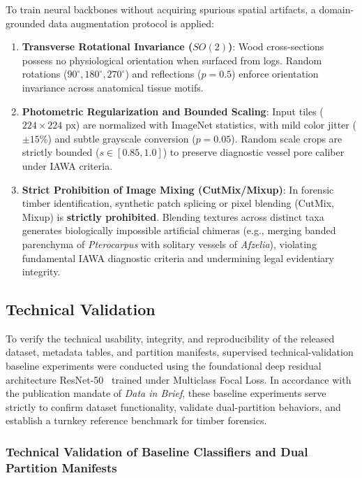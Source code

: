 \documentclass[a4paper,fleqn,12pt]{cas-sc}
\begin{document}
To train neural backbones without acquiring spurious spatial artifacts, a domain-grounded data augmentation protocol is applied:
\begin{enumerate}[leftmargin=*,itemsep=1pt,topsep=1pt]
    \item \textbf{Transverse Rotational Invariance ($SO(2)$)}: Wood cross-sections possess no physiological orientation when surfaced from logs. Random rotations ($90^\circ, 180^\circ, 270^\circ$) and reflections ($p = 0.5$) enforce orientation invariance across anatomical tissue motifs.
    \item \textbf{Photometric Regularization and Bounded Scaling}: Input tiles ($224 \times 224$ px) are normalized with ImageNet statistics, with mild color jitter ($\pm 15\%$) and subtle grayscale conversion ($p = 0.05$). Random scale crops are strictly bounded ($s \in [0.85, 1.0]$) to preserve diagnostic vessel pore caliber under IAWA criteria.
    \item \textbf{Strict Prohibition of Image Mixing (CutMix/Mixup)}: In forensic timber identification, synthetic patch splicing or pixel blending (CutMix, Mixup) is \textbf{strictly prohibited}. Blending textures across distinct taxa generates biologically impossible artificial chimeras (e.g., merging banded parenchyma of \textit{Pterocarpus} with solitary vessels of \textit{Afzelia}), violating fundamental IAWA diagnostic criteria and undermining legal evidentiary integrity.
\end{enumerate}

\subsection{Technical Validation}
\label{sec:technical_validation}

To verify the technical usability, integrity, and reproducibility of the released dataset, metadata tables, and partition manifests, supervised technical-validation baseline experiments were conducted using the foundational deep residual architecture ResNet-50~\cite{resnet} trained under Multiclass Focal Loss. In accordance with the publication mandate of \textit{Data in Brief}, these baseline experiments serve strictly to confirm dataset functionality, validate dual-partition behaviors, and establish a turnkey reference benchmark for timber forensics.

\subsubsection{Technical Validation of Baseline Classifiers and Dual Partition Manifests}
\label{sec:technical_validation_results}
\end{document}
